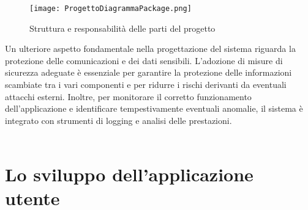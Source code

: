 \begin{figure}[htb]
    \centering
    \texttt{[image: ProgettoDiagrammaPackage.png]}
    \caption{Struttura e responsabilità delle parti del progetto}
\end{figure}

\clearpage

Un ulteriore aspetto fondamentale nella progettazione del sistema riguarda 
la protezione delle comunicazioni e dei dati sensibili.
L’adozione di misure di sicurezza adeguate è essenziale per garantire la protezione delle informazioni scambiate tra i vari componenti e
per ridurre i rischi derivanti da eventuali attacchi esterni.
Inoltre, per monitorare il corretto funzionamento dell’applicazione e identificare tempestivamente eventuali anomalie,
il sistema è integrato con strumenti di logging e analisi delle prestazioni.\\
\\




\clearpage
\section{Lo sviluppo dell'applicazione utente}


